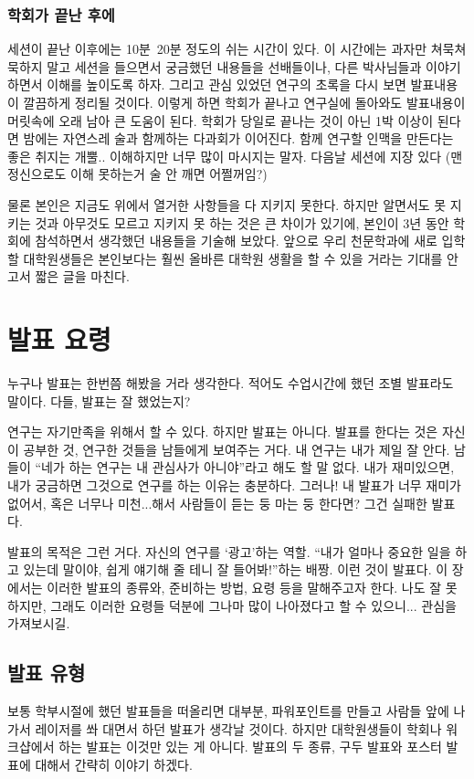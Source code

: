 \subsubsection{학회가 끝난 후에}
세션이 끝난 이후에는 10분~20분 정도의 쉬는 시간이 있다. 이 시간에는 과자만
쳐묵쳐묵하지 말고 세션을 들으면서 궁금했던 내용들을 선배들이나, 다른 박사님들과
이야기 하면서 이해를 높이도록 하자. 그리고 관심 있었던 연구의 초록을 다시 보면
발표내용이 깔끔하게 정리될 것이다. 이렇게 하면 학회가 끝나고 연구실에 돌아와도
발표내용이 머릿속에 오래 남아 큰 도움이 된다. 학회가 당일로 끝나는 것이 아닌 1박
이상이 된다면 밤에는 자연스레 술과 함께하는 다과회가 이어진다. 함께 연구할 인맥을
만든다는 좋은 취지는 개뿔.. 이해하지만 너무 많이 마시지는 말자. 다음날 세션에
지장 있다 (맨정신으로도 이해 못하는거 술 안 깨면 어쩔꺼임?)

\starbreak   

물론 본인은 지금도 위에서 열거한 사항들을 다 지키지 못한다. 하지만 알면서도 못
지키는 것과 아무것도 모르고 지키지 못 하는 것은 큰 차이가 있기에, 본인이 3년 동안
학회에 참석하면서 생각했던 내용들을 기술해 보았다. 앞으로 우리 천문학과에 새로
입학할 대학원생들은 본인보다는 훨씬 올바른 대학원 생활을 할 수 있을 거라는 기대를
안고서 짧은 글을 마친다.
 
\section{발표 요령}
누구나 발표는 한번쯤 해봤을 거라 생각한다. 적어도 수업시간에 했던 조별 발표라도
말이다. 다들, 발표는 잘 했었는지?

연구는 자기만족을 위해서 할 수 있다. 하지만 발표는 아니다. 발표를 한다는 것은
자신이 공부한 것, 연구한 것들을 남들에게 보여주는 거다. 내 연구는 내가 제일 잘
안다. 남들이 “네가 하는 연구는 내 관심사가 아니야”라고 해도 할 말 없다. 내가
재미있으면, 내가 궁금하면 그것으로 연구를 하는 이유는 충분하다. 그러나! 내 발표가
너무 재미가 없어서, 혹은 너무나 미천...해서 사람들이 듣는 둥 마는 둥 한다면? 그건
실패한 발표다.

발표의 목적은 그런 거다. 자신의 연구를 ‘광고’하는 역할. “내가 얼마나 중요한 일을
하고 있는데 말이야, 쉽게 얘기해 줄 테니 잘 들어봐!”하는 배짱. 이런 것이
발표다. 이 장에서는 이러한 발표의 종류와, 준비하는 방법, 요령 등을 말해주고자
한다. 나도 잘 못하지만, 그래도 이러한 요령들 덕분에 그나마 많이 나아졌다고 할 수
있으니... 관심을 가져보시길.

\subsection{발표 유형}
보통 학부시절에 했던 발표들을 떠올리면 대부분, 파워포인트를 만들고 사람들 앞에
나가서 레이저를 쏴 대면서 하던 발표가 생각날 것이다. 하지만 대학원생들이 학회나
워크샵에서 하는 발표는 이것만 있는 게 아니다. 발표의 두 종류, 구두 발표와 포스터
발표에 대해서 간략히 이야기 하겠다.

